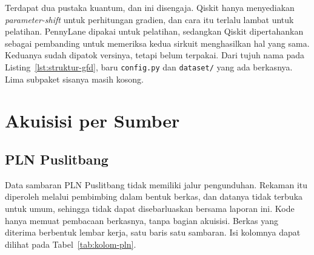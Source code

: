 Terdapat dua pustaka kuantum, dan ini disengaja.
Qiskit hanya menyediakan \mbox{\textit{parameter-shift}} untuk perhitungan gradien, dan cara itu terlalu lambat untuk pelatihan.
PennyLane dipakai untuk pelatihan, sedangkan Qiskit dipertahankan sebagai pembanding untuk memeriksa kedua sirkuit menghasilkan hal yang sama.
Keduanya sudah dipatok versinya, tetapi belum terpakai.
Dari tujuh nama pada Listing~\ref{lst:struktur-gfd}, baru \texttt{config.py} dan \texttt{dataset/} yang ada berkasnya.
Lima subpaket sisanya masih kosong.

\section{Akuisisi per Sumber}
\label{sec:akuisisi}

\subsection{PLN Puslitbang}
\label{subsec:pln}
Data sambaran PLN Puslitbang tidak memiliki jalur pengunduhan.
Rekaman itu diperoleh melalui pembimbing dalam bentuk berkas, dan datanya tidak terbuka untuk umum, sehingga tidak dapat disebarluaskan bersama laporan ini.
Kode hanya memuat pembacaan berkasnya, tanpa bagian akuisisi.
Berkas yang diterima berbentuk lembar kerja, satu baris satu sambaran.
Isi kolomnya dapat dilihat pada Tabel~\ref{tab:kolom-pln}.

